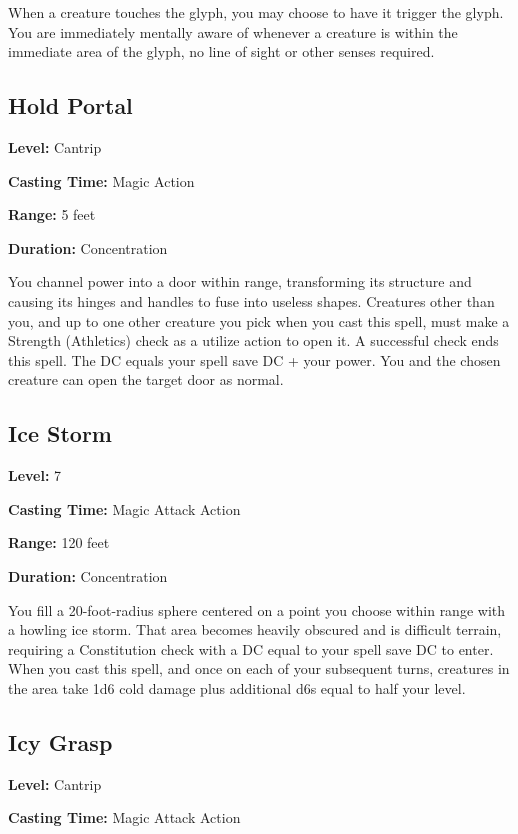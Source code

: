\documentclass[12pt,letterpaper,twocolumn,openany,nodeprecatedcode,bg=none]{dndbook}
\begin{document}
When a creature touches the glyph, you may choose to have it trigger the
glyph. You are immediately mentally aware of whenever a creature is
within the immediate area of the glyph, no line of sight or other senses
required.

\subsection{Hold Portal}\label{hold-portal}

\textbf{Level:} Cantrip

\textbf{Casting Time:} Magic Action

\textbf{Range:} 5 feet

\textbf{Duration:} Concentration

You channel power into a door within range, transforming its structure
and causing its hinges and handles to fuse into useless shapes.
Creatures other than you, and up to one other creature you pick when you
cast this spell, must make a Strength (Athletics) check as a utilize
action to open it. A successful check ends this spell. The DC equals
your spell save DC + your power. You and the chosen creature can open
the target door as normal.

\subsection{Ice Storm}\label{ice-storm}

\textbf{Level:} 7

\textbf{Casting Time:} Magic Attack Action

\textbf{Range:} 120 feet

\textbf{Duration:} Concentration

You fill a 20-foot-radius sphere centered on a point you choose within
range with a howling ice storm. That area becomes heavily obscured and
is difficult terrain, requiring a Constitution check with a DC equal to
your spell save DC to enter. When you cast this spell, and once on each
of your subsequent turns, creatures in the area take 1d6 cold damage
plus additional d6s equal to half your level.

\clearpage

\subsection{Icy Grasp}\label{icy-grasp}

\textbf{Level:} Cantrip

\textbf{Casting Time:} Magic Attack Action
\end{document}
